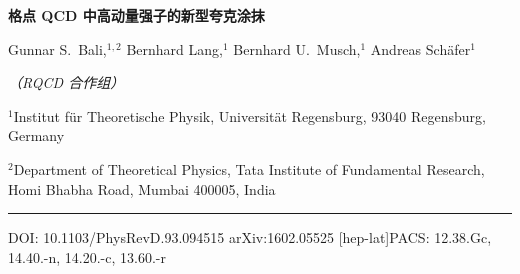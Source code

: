 \documentclass[11pt]{ctexart}
\begin{document}
\begin{center}
  {\LARGE\bfseries 格点 QCD 中高动量强子的新型夸克涂抹\par}
  \vspace{1.2em}
  {\large Gunnar S.~Bali,$^{1,2}$ Bernhard Lang,$^{1}$ Bernhard U.~Musch,$^{1}$ Andreas Sch\"afer$^{1}$\par}
  \vspace{0.4em}
  {\small\itshape （RQCD 合作组）\par}
  \vspace{0.8em}
  {\small $^{1}$Institut f\"ur Theoretische Physik, Universit\"at Regensburg, 93040 Regensburg, Germany\par}
  \vspace{0.15em}
  {\small $^{2}$Department of Theoretical Physics, Tata Institute of Fundamental Research, Homi Bhabha Road, Mumbai 400005, India\par}
\end{center}

\vspace{0.4em}
\noindent\rule{\textwidth}{0.4pt}
\vspace{0.15em}
\footnotesize
DOI: 10.1103/PhysRevD.93.094515 \hfill arXiv:1602.05525 [hep-lat]\quad PACS: 12.38.Gc, 14.40.-n, 14.20.-c, 13.60.-r
\normalsize
\vspace{0.6em}

\begin{quote}

\end{quote}








\end{document}
